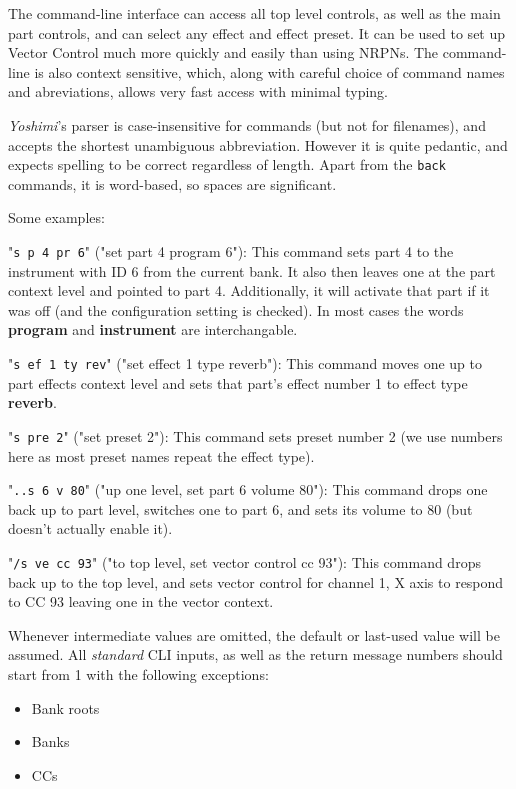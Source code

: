 \documentclass[
 11pt,
 twoside,
 a4paper,
 final                                 %
]{article}
\begin{document}
   The command-line interface can access all top level controls, as well as the
   main part controls, and can select any effect and effect preset.  It can be
   used to set up Vector Control much more quickly and easily than using NRPNs.
   The command-line is also context sensitive, which, along with careful choice
   of command names and abreviations, allows very fast access with minimal
   typing.

   \textsl{Yoshimi}'s parser is case-insensitive for commands (but not for
   filenames), and accepts the shortest unambiguous abbreviation. However it is
   quite pedantic, and expects spelling to be correct regardless of length.
   Apart from the \texttt{back} commands, it is word-based, so spaces are
   significant.

   Some examples:

   "\texttt{s p 4 pr 6}" ("set part 4 program 6"):
   This command sets part 4 to the instrument with ID 6 from the current bank.
   It also then leaves one at the part context level and pointed to part 4.
   Additionally, it will activate that part if it was off (and the
   configuration setting is checked). In most cases the words \textbf{program} and
   \textbf{instrument} are interchangable.

   "\texttt{s ef 1 ty rev}" ("set effect 1 type reverb"):
   This command moves one up to part effects context level and sets that part's
   effect number 1 to effect type \textbf{reverb}.

   "\texttt{s pre 2}" ("set preset 2"):
   This command sets preset number 2 (we use numbers here as most preset names
   repeat the effect type).

   "\texttt{..s 6 v 80}" ("up one level, set part 6 volume 80"):
   This command drops one back up to part level, switches one to part 6, and
   sets its volume to 80 (but doesn't actually enable it).

   "\texttt{/s ve cc 93}" ("to top level, set vector control cc 93"):
   This command drops back up to the top level, and sets vector control for
   channel 1, X axis to respond to CC 93 leaving one in the vector context.

   Whenever intermediate values are omitted, the default or last-used value
   will be assumed.
	All \textsl{standard} CLI inputs, as well as the return message numbers
	should start from 1 with the following exceptions:

	\begin{itemize}
		\item Bank roots
   	\item Banks
   	\item CCs
	\end{itemize}
\end{document}
